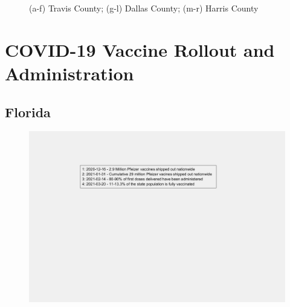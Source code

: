 \documentclass[]{article}
\begin{document}
\begin{figure}
	\caption{(a-f) Travis County; (g-l) Dallas County; (m-r) Harris County}
\label{fig:foobar}
\end{figure}
\FloatBarrier
\vspace{5mm}

\section{COVID-19 Vaccine Rollout and Administration}


\subsection{Florida}

\begin{figure}[!h]
	\includegraphics[width=\linewidth]{legends/vaccine_rollout_legend.png}
	\caption{}
	\label{fig:legends/vaccine_rollout_legendLabel}
\end{figure}
\end{document}
